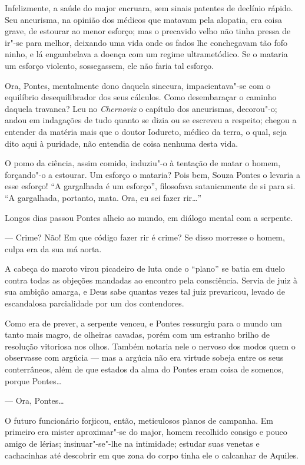 Infelizmente, a saúde do major encruara, sem sinais patentes de declínio
rápido. Seu aneurisma, na opinião dos médicos que matavam pela alopatia,
era coisa grave, de estourar ao menor esforço; mas o precavido velho não
tinha pressa de ir"-se para melhor, deixando uma vida onde os fados lhe
conchegavam tão fofo ninho, e lá engambelava a doença com um regime
ultrametódico. Se o mataria um esforço violento, sossegassem, ele não
faria tal esforço.

Ora, Pontes, mentalmente dono daquela sinecura, impacientava"-se com o
equilíbrio desequilibrador dos seus cálculos. Como desembaraçar o
caminho daquela travanca? Leu no \emph{Chernoviz} o capítulo dos
aneurismas, decorou"-o; andou em indagações de tudo quanto se dizia ou se
escreveu a respeito; chegou a entender da matéria mais que o doutor
Iodureto, médico da terra, o qual, seja dito aqui à puridade, não
entendia de coisa nenhuma desta vida.

O pomo da ciência, assim comido, induziu"-o à tentação de matar o homem,
forçando"-o a estourar. Um esforço o mataria? Pois bem, Souza Pontes o
levaria a esse esforço! ``A gargalhada é um esforço'', filosofava
satanicamente de si para si. ``A gargalhada, portanto, mata. Ora, eu sei
fazer rir\ldots{}''

Longos dias passou Pontes alheio ao mundo, em diálogo mental com a
serpente.

--- Crime? Não! Em que código fazer rir é crime? Se disso morresse o
homem, culpa era da sua má aorta.

A cabeça do maroto virou picadeiro de luta onde o ``plano'' se batia em
duelo contra todas as objeções mandadas ao encontro pela consciência.
Servia de juiz à sua ambição amarga, e Deus sabe quantas vezes tal juiz
prevaricou, levado de escandalosa parcialidade por um dos contendores.

Como era de prever, a serpente venceu, e Pontes ressurgiu para o mundo
um tanto mais magro, de olheiras cavadas, porém com um estranho brilho
de resolução vitoriosa nos olhos. Também notaria nele o nervoso dos
modos quem o observasse com argúcia --- mas a argúcia não era virtude
sobeja entre os seus conterrâneos, além de que estados da alma do Pontes
eram coisa de somenos\emph{,} porque Pontes\ldots{}

--- Ora, Pontes\ldots{}

O futuro funcionário forjicou, então, meticulosos planos de campanha. Em
primeiro era mister aproximar"-se do major, homem recolhido consigo e
pouco amigo de lérias; insinuar"-se"-lhe na intimidade; estudar suas
venetas e cachacinhas até descobrir em que zona do corpo tinha ele o
calcanhar de Aquiles.

